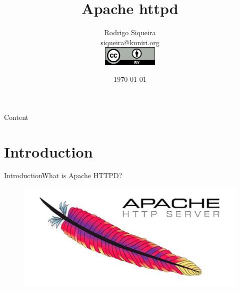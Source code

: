 \documentclass[10pt]{beamer}
\title[] %
{ %
      \textbf{Apache httpd}
}
\subtitle[Managements]
{
}
\author[Rodrigo Siqueira]
{      Rodrigo Siqueira\\
      {\ttfamily siqueira@kuniri.org} \\
    \includegraphics[width=0.2\textwidth, keepaspectratio=true]{Feathergraphics/3.png}
}
\institute[]
{
      Institute of Mathematics and Statistics\\
      University of Sao Paulo\\

}
\date{\today}
\begin{document}

{\1%
\begin{frame}
  \titlepage %
\end{frame}}

\begin{frame}[shrink]{Content}{}
  \tableofcontents
\end{frame}

\section{Introduction}
\begin{frame}{Introduction}{What is Apache HTTPD?}
  \begin{figure}[ht]
    \centering
    \includegraphics[width=1\textwidth, keepaspectratio=true]{images/apachehttpd.jpg}
  \end{figure}
\end{frame}
\end{document}

